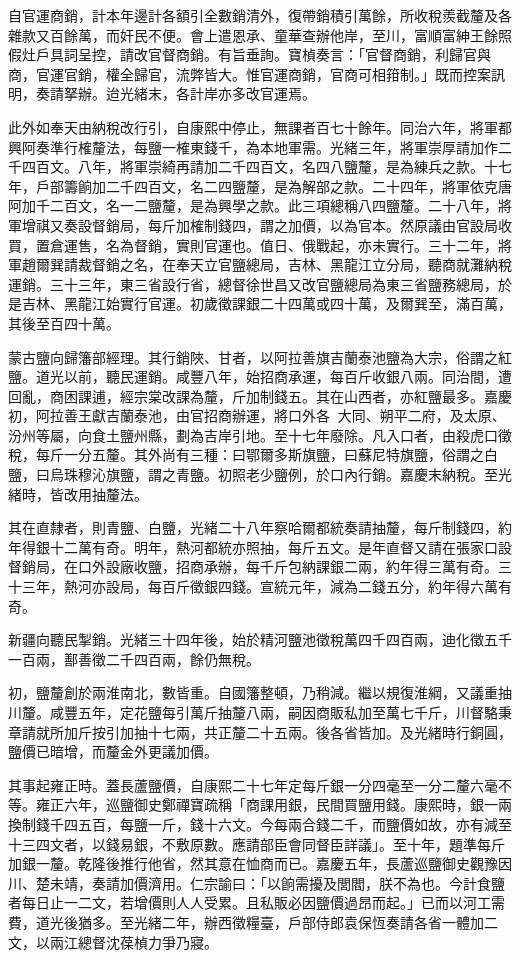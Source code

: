 \begin{pinyinscope}
自官運商銷，計本年邊計各額引全數銷清外，復帶銷積引萬餘，所收稅羨截釐及各雜款又百餘萬，而奸民不便。會上遣恩承、童華查辦他岸，至川，富順富紳王餘照假灶戶具詞呈控，請改官督商銷。有旨垂詢。寶楨奏言：「官督商銷，利歸官與商，官運官銷，權全歸官，流弊皆大。惟官運商銷，官商可相箝制。」既而控案訊明，奏請拏辦。迨光緒末，各計岸亦多改官運焉。

此外如奉天由納稅改行引，自康熙中停止，無課者百七十餘年。同治六年，將軍都興阿奏準行榷釐法，每鹽一榷東錢千，為本地軍需。光緒三年，將軍崇厚請加作二千四百文。八年，將軍崇綺再請加二千四百文，名四八鹽釐，是為練兵之款。十七年，戶部籌餉加二千四百文，名二四鹽釐，是為解部之款。二十四年，將軍依克唐阿加千二百文，名一二鹽釐，是為興學之款。此三項總稱八四鹽釐。二十八年，將軍增祺又奏設督銷局，每斤加榷制錢四，謂之加價，以為官本。然原議由官設局收買，置倉運售，名為督銷，實則官運也。值日、俄戰起，亦未實行。三十二年，將軍趙爾巽請裁督銷之名，在奉天立官鹽總局，吉林、黑龍江立分局，聽商就灘納稅運銷。三十三年，東三省設行省，總督徐世昌又改官鹽總局為東三省鹽務總局，於是吉林、黑龍江始實行官運。初歲徵課銀二十四萬或四十萬，及爾巽至，滿百萬，其後至百四十萬。

蒙古鹽向歸籓部經理。其行銷陜、甘者，以阿拉善旗吉蘭泰池鹽為大宗，俗謂之紅鹽。道光以前，聽民運銷。咸豐八年，始招商承運，每百斤收銀八兩。同治間，遭回亂，商困課逋，經宗棠改課為釐，斤加制錢五。其在山西者，亦紅鹽最多。嘉慶初，阿拉善王獻吉蘭泰池，由官招商辦運，將口外各，大同、朔平二府，及太原、汾州等屬，向食土鹽州縣，劃為吉岸引地。至十七年廢除。凡入口者，由殺虎口徵稅，每斤一分五釐。其外尚有三種：曰鄂爾多斯旗鹽，曰蘇尼特旗鹽，俗謂之白鹽，曰烏珠穆沁旗鹽，謂之青鹽。初照老少鹽例，於口內行銷。嘉慶末納稅。至光緒時，皆改用抽釐法。

其在直隸者，則青鹽、白鹽，光緒二十八年察哈爾都統奏請抽釐，每斤制錢四，約年得銀十二萬有奇。明年，熱河都統亦照抽，每斤五文。是年直督又請在張家口設督銷局，在口外設廠收鹽，招商承辦，每千斤包納課銀二兩，約年得三萬有奇。三十三年，熱河亦設局，每百斤徵銀四錢。宣統元年，減為二錢五分，約年得六萬有奇。

新疆向聽民掣銷。光緒三十四年後，始於精河鹽池徵稅萬四千四百兩，迪化徵五千一百兩，鄯善徵二千四百兩，餘仍無稅。

初，鹽釐創於兩淮南北，數皆重。自國籓整頓，乃稍減。繼以規復淮綱，又議重抽川釐。咸豐五年，定花鹽每引萬斤抽釐八兩，嗣因商販私加至萬七千斤，川督駱秉章請就所加斤按引加抽十七兩，共正釐二十五兩。後各省皆加。及光緒時行銅圓，鹽價已暗增，而釐金外更議加價。

其事起雍正時。蓋長蘆鹽價，自康熙二十七年定每斤銀一分四毫至一分二釐六毫不等。雍正六年，巡鹽御史鄭禪寶疏稱「商課用銀，民間買鹽用錢。康熙時，銀一兩換制錢千四五百，每鹽一斤，錢十六文。今每兩合錢二千，而鹽價如故，亦有減至十三四文者，以錢易銀，不敷原數。應請部臣會同督臣詳議」。至十年，題準每斤加銀一釐。乾隆後推行他省，然其意在恤商而已。嘉慶五年，長蘆巡鹽御史觀豫因川、楚未靖，奏請加價濟用。仁宗諭曰：「以餉需擾及閭閻，朕不為也。今計食鹽者每日止一二文，若增價則人人受累。且私販必因鹽價過昂而起。」已而以河工需費，道光後猶多。至光緒二年，辦西徵糧臺，戶部侍郎袁保恆奏請各省一體加二文，以兩江總督沈葆楨力爭乃寢。


\end{pinyinscope}
